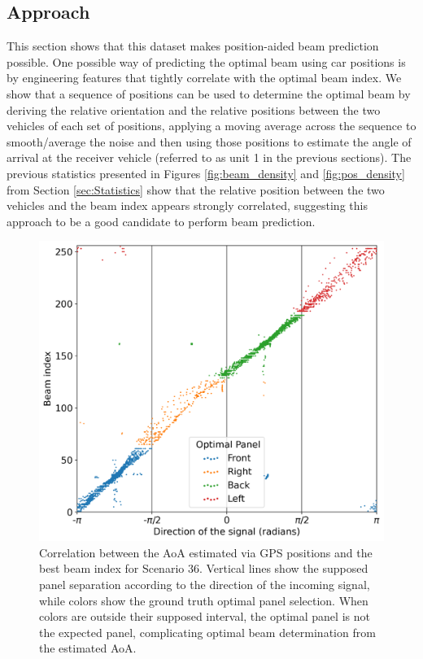 \documentclass[10pt,comsoc]{IEEEtran}
\begin{document}
\subsection{Approach} \label{subsec:approach}

This section shows that this dataset makes position-aided beam prediction possible. One possible way of predicting the optimal beam using car positions is by engineering features that tightly correlate with the optimal beam index. We show that a sequence of positions can be used to determine the optimal beam by deriving the relative orientation and the relative positions between the two vehicles of each set of positions, applying a moving average across the sequence to smooth/average the noise and then using those positions to estimate the angle of arrival at the receiver vehicle (referred to as unit 1 in the previous sections). The previous statistics presented in Figures \ref{fig:beam_density} and \ref{fig:pos_density} from Section \ref{sec:Statistics} show that the relative position between the two vehicles and the beam index appears strongly correlated, suggesting this approach to be a good candidate to perform beam prediction. 

\begin{figure}[t]
	\centering
	\includegraphics[width=1\columnwidth]{correlation_figure_big}
	\caption{Correlation between the AoA estimated via GPS positions and the best beam index for Scenario 36. Vertical lines show the supposed panel separation according to the direction of the incoming signal, while colors show the ground truth optimal panel selection. When colors are outside their supposed interval, the optimal panel is not the expected panel, complicating optimal beam determination from the estimated AoA. }
	\label{fig:correlation}
        \vspace{-2mm}
\end{figure}
\end{document}
